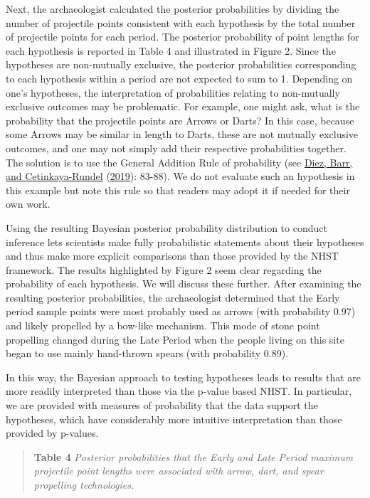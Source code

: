 \documentclass[
]{article}
\begin{document}
Next, the archaeologist calculated the posterior probabilities by
dividing the number of projectile points consistent with each hypothesis
by the total number of projectile points for each period. The posterior
probability of point lengths for each hypothesis is reported in Table 4
and illustrated in Figure 2. Since the hypotheses are non-mutually
exclusive, the posterior probabilities corresponding to each hypothesis
within a period are not expected to sum to 1. Depending on one's
hypotheses, the interpretation of probabilities relating to non-mutually
exclusive outcomes may be problematic. For example, one might ask, what
is the probability that the projectile points are Arrows or Darts? In
this case, because some Arrows may be similar in length to Darts, these
are not mutually exclusive outcomes, and one may not simply add their
respective probabilities together. The solution is to use the General
Addition Rule of probability (see
\protect\hyperlink{ref-diez_open_2019}{Diez, Barr, and Cetinkaya-Rundel}
(\protect\hyperlink{ref-diez_open_2019}{2019}): 83-88). We do not
evaluate such an hypothesis in this example but note this rule so that
readers may adopt it if needed for their own work.

Using the resulting Bayesian posterior probability distribution to
conduct inference lets scientists make fully probabilistic statements
about their hypotheses and thus make more explicit comparisons than
those provided by the NHST framework. The results highlighted by Figure
2 seem clear regarding the probability of each hypothesis. We will
discuss these further. After examining the resulting posterior
probabilities, the archaeologist determined that the Early period sample
points were most probably used as arrows (with probability 0.97) and
likely propelled by a bow-like mechanism. This mode of stone point
propelling changed during the Late Period when the people living on this
site began to use mainly hand-thrown spears (with probability 0.89).

In this way, the Bayesian approach to testing hypotheses leads to
results that are more readily interpreted than those via the p-value
based NHST. In particular, we are provided with measures of probability
that the data support the hypotheses, which have considerably more
intuitive interpretation than those provided by p-values.

\newpage

\begin{quote}
\textbf{Table 4} \emph{Posterior probabilities that the Early and Late
Period maximum projectile point lengths were associated with arrow,
dart, and spear propelling technologies.}
\end{quote}
\end{document}
